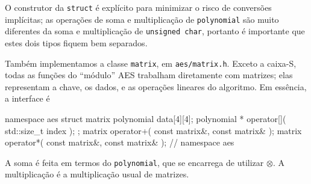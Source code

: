 \documentclass{article}
\newcommand{\xor}{\otimes}
\begin{document}
O construtor da \verb"struct" é explícito para minimizar o risco
de conversões implícitas;
as operações de soma e multiplicação de \verb"polynomial"
são muito diferentes da soma e multiplicação de \verb"unsigned char",
portanto é importante que estes dois tipos fiquem bem separados.

Também implementamos a classe \verb"matrix", em \verb"aes/matrix.h".
Exceto a caixa-S,
todas as funções do ``módulo'' AES trabalham diretamente com matrizes;
elas representam a chave, os dados, e as operações lineares do algoritmo.
Em essência, a interface é
\begin{cppcode}
    namespace aes {
        struct matrix {
            polynomial data[4][4];
            polynomial * operator[]( std::size_t index );
        };
        matrix operator+( const matrix&, const matrix& );
        matrix operator*( const matrix&, const matrix& );
    } // namespace aes
\end{cppcode}

A soma é feita em termos do \verb"polynomial",
que se encarrega de utilizar $\xor$.
A multiplicação é a multiplicação usual de matrizes.
\end{document}
